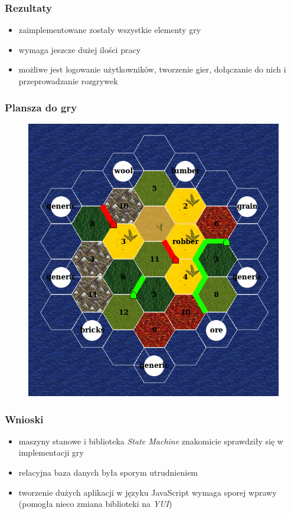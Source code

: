 \documentclass[12pt]{beamer}
\begin{document}
\begin{frame}
  \frametitle{Rezultaty}
  \begin{itemize}
  \item zaimplementowane zostały wszystkie elementy gry
  \item wymaga jeszcze dużej ilości pracy
  \item możliwe jest logowanie użytkowników, tworzenie gier,
    dołączanie do nich i przeprowadzanie rozgrywek
  \end{itemize}
\end{frame}

\begin{frame}
  \frametitle{Plansza do gry}
  \begin{figure}
    \includegraphics[width=0.6\linewidth]{board.png}
  \end{figure}
\end{frame}

\begin{frame}
  \frametitle{Wnioski}
  \begin{itemize}
  \item maszyny stanowe i biblioteka \emph{State Machine} znakomicie
    sprawdziły się w implementacji gry
  \item relacyjna baza danych była sporym utrudnieniem
  \item tworzenie dużych aplikacji w języku JavaScript wymaga sporej
    wprawy (pomogła nieco zmiana biblioteki na \emph{YUI})
  \end{itemize}
\end{frame}
\end{document}
